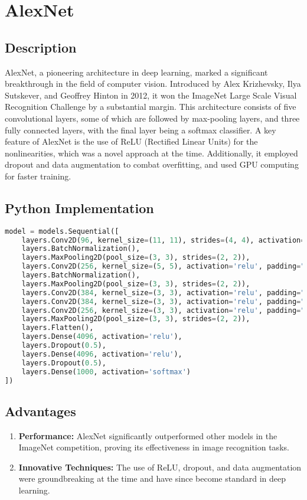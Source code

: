 \chapter{AlexNet}

\section{Description}
AlexNet, a pioneering architecture in deep learning, marked a significant breakthrough in the field of computer vision. Introduced by Alex Krizhevsky, Ilya Sutskever, and Geoffrey Hinton in 2012, it won the ImageNet Large Scale Visual Recognition Challenge by a substantial margin. This architecture consists of five convolutional layers, some of which are followed by max-pooling layers, and three fully connected layers, with the final layer being a softmax classifier. A key feature of AlexNet is the use of ReLU (Rectified Linear Units) for the nonlinearities, which was a novel approach at the time. Additionally, it employed dropout and data augmentation to combat overfitting, and used GPU computing for faster training.

\section{Python Implementation}
\begin{lstlisting}[language=Python]
model = models.Sequential([
    layers.Conv2D(96, kernel_size=(11, 11), strides=(4, 4), activation='relu', input_shape=(227,227,3)),
    layers.BatchNormalization(),
    layers.MaxPooling2D(pool_size=(3, 3), strides=(2, 2)),
    layers.Conv2D(256, kernel_size=(5, 5), activation='relu', padding="same"),
    layers.BatchNormalization(),
    layers.MaxPooling2D(pool_size=(3, 3), strides=(2, 2)),
    layers.Conv2D(384, kernel_size=(3, 3), activation='relu', padding="same"),
    layers.Conv2D(384, kernel_size=(3, 3), activation='relu', padding="same"),
    layers.Conv2D(256, kernel_size=(3, 3), activation='relu', padding="same"),
    layers.MaxPooling2D(pool_size=(3, 3), strides=(2, 2)),
    layers.Flatten(),
    layers.Dense(4096, activation='relu'),
    layers.Dropout(0.5),
    layers.Dense(4096, activation='relu'),
    layers.Dropout(0.5),
    layers.Dense(1000, activation='softmax')
])
\end{lstlisting}

\section{Advantages}
\begin{enumerate}
    \item \textbf{Performance:} AlexNet significantly outperformed other models in the ImageNet competition, proving its effectiveness in image recognition tasks.
    \item \textbf{Innovative Techniques:} The use of ReLU, dropout, and data augmentation were groundbreaking at the time and have since become standard in deep learning.
\end{enumerate}

